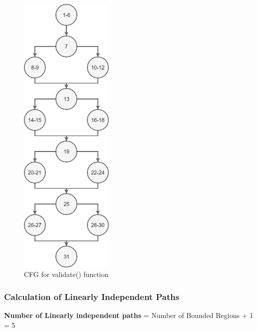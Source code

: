 \documentclass{scrreprt}
\begin{document}
\begin{figure}[H]
\centering
\includegraphics[width=0.4\textwidth, keepaspectratio]{validateSignup.png}
\caption{CFG for validate() function}
\end{figure}


\newpage


\subsubsection{Calculation of Linearly Independent Paths}
\textbf{Number of Linearly independent paths} = Number of Bounded Regions + 1 = 5
\end{document}
